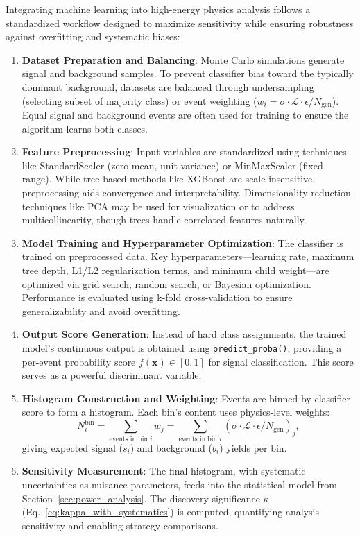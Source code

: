 Integrating machine learning into high-energy physics analysis follows a standardized workflow designed to maximize sensitivity while ensuring robustness against overfitting and systematic biases:

\begin{enumerate}
    \item \textbf{Dataset Preparation and Balancing}: Monte Carlo simulations generate signal and background samples. To prevent classifier bias toward the typically dominant background, datasets are balanced through undersampling (selecting subset of majority class) or event weighting ($w_i = \sigma \cdot \mathcal{L} \cdot \epsilon / N_{\text{gen}}$). Equal signal and background events are often used for training to ensure the algorithm learns both classes.
    
    \item \textbf{Feature Preprocessing}: Input variables are standardized using techniques like StandardScaler (zero mean, unit variance) or MinMaxScaler (fixed range). While tree-based methods like XGBoost are scale-insensitive, preprocessing aids convergence and interpretability. Dimensionality reduction techniques like PCA may be used for visualization or to address multicollinearity, though trees handle correlated features naturally.
    
    \item \textbf{Model Training and Hyperparameter Optimization}: The classifier is trained on preprocessed data. Key hyperparameters—learning rate, maximum tree depth, L1/L2 regularization terms, and minimum child weight—are optimized via grid search, random search, or Bayesian optimization. Performance is evaluated using k-fold cross-validation to ensure generalizability and avoid overfitting.
    
    \item \textbf{Output Score Generation}: Instead of hard class assignments, the trained model's continuous output is obtained using \texttt{predict\_proba()}, providing a per-event probability score $f(\mathbf{x}) \in [0, 1]$ for signal classification. This score serves as a powerful discriminant variable.
    
    \item \textbf{Histogram Construction and Weighting}: Events are binned by classifier score to form a histogram. Each bin's content uses physics-level weights:
    \[
    N_i^{\text{bin}} = \sum_{\text{events in bin } i} w_j = \sum_{\text{events in bin } i} \left( \sigma \cdot \mathcal{L} \cdot \epsilon / N_{\text{gen}} \right)_j,
    \]
    giving expected signal ($s_i$) and background ($b_i$) yields per bin.
    
    \item \textbf{Sensitivity Measurement}: The final histogram, with systematic uncertainties as nuisance parameters, feeds into the statistical model from Section~\ref{sec:power_analysis}. The discovery significance $\kappa$ (Eq.~\ref{eq:kappa_with_systematics}) is computed, quantifying analysis sensitivity and enabling strategy comparisons.
\end{enumerate}

